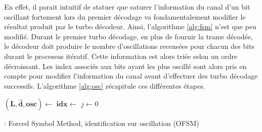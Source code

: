 En effet, il parait intuitif de statuer que saturer l'information du canal d'un bit oscillant fortement lors du 
premier décodage va fondamentalement modifier le résultat produit par le turbo décodeur. Ainsi, l'algorithme \ref{alg:fsm}
n'est que peu modifié. Durant le premier turbo décodage, en plus de fournir la trame décodée, le décodeur doit produire le 
nombre d'oscillations recensées pour chacun des bits durant le processus itératif. Cette information est alors triée 
selon un ordre décroissant. Les index associés aux bits ayant les plus oscillé sont alors pris en compte pour modifier 
l'information du canal avant d'effectuer des turbo décodage successifs. L'algorithme \ref{alg:osc} récapitule ces différentes 
étapes.
\begin{center}
\begin{minipage}{.9\textwidth}%
	\begin{algorithm}[H]
		\DontPrintSemicolon

		$\mathbf{(L,\hat{d},osc)} \gets$ \;
		$\mathbf{idx} \gets$ \;
		\;
		$j \gets 0$\;
	\caption{: Forced Symbol Method, identification sur oscillation (OFSM)}
	\label{alg:osc}
	\end{algorithm}
\end{minipage}
\end{center}

